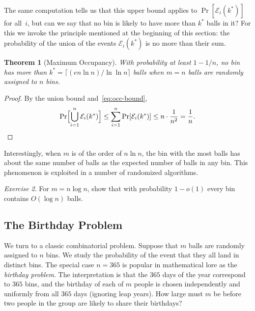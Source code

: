 \documentclass[twoside,12pt]{book}
\theoremstyle{plain}
\newtheorem{theorem}{Theorem}[chapter]
\theoremstyle{definition}
\theoremstyle{remark}
\newtheorem{exercise}[theorem]{Exercise}
\begin{document}
The same computation tells us that this upper bound applies to $\Pr[\mathcal{E}_i(k^*)]$ for all~$i$, but can we say that no bin is likely to have more than $k^*$ balls in it? For this we invoke the principle mentioned at the beginning of this section: the probability of the union of the events $\mathcal{E}_i(k^*)$ is no more than their sum.

\begin{theorem}[Maximum Occupancy]
\label{thm:occ-max}
With probability at least $1 - 1/n$, no bin has more than $k^* = \lceil (en \ln n) / \ln \ln n \rceil$ balls when $m = n$ balls are randomly assigned to $n$ bins.
\end{theorem}

\begin{proof}
By the union bound and~\eqref{eq:occ-bound},
\[
\Pr\Bigl[\bigcup_{i=1}^{n} \mathcal{E}_i(k^*)\Bigr] \leq \sum_{i=1}^{n} \Pr[\mathcal{E}_i(k^*)] \leq n \cdot \frac{1}{n^2} = \frac{1}{n}.
\]
\end{proof}

\medskip

Interestingly, when $m$ is of the order of $n \ln n$, the bin with the most balls has about the same number of balls as the expected number of balls in any bin. This phenomenon is exploited in a number of randomized algorithms.

\begin{exercise}
For $m = n \log n$, show that with probability $1 - o(1)$ every bin contains $O(\log n)$ balls.
\end{exercise}

\subsection{The Birthday Problem}

We turn to a classic combinatorial problem. Suppose that $m$ balls are randomly assigned to $n$ bins. We study the probability of the event that they all land in distinct bins. The special case $n = 365$ is popular in mathematical lore as the \emph{birthday problem}. The interpretation is that the $365$ days of the year correspond to $365$ bins, and the birthday of each of $m$ people is chosen independently and uniformly from all $365$ days (ignoring leap years). How large must $m$ be before two people in the group are likely to share their birthdays?
\end{document}
